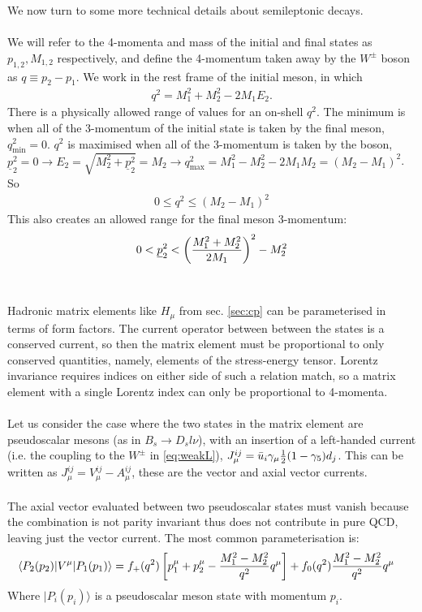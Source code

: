 We now turn to some more technical details about semileptonic decays.
\\ \\
We will refer to the 4-momenta and mass of the initial and final states as $p_{1,2},M_{1,2}$ respectively, and define the 4-momentum taken away by the $W^{\pm}$ boson as $q \equiv p_2 - p_1$. We work in the rest frame of the initial meson, in which
\begin{align}
	q^2 = M_1^2 + M_2^2 - 2M_1 E_2.
\end{align}
There is a physically allowed range of values for an on-shell $q^2$. The minimum is when all of the 3-momentum of the initial state is taken by the final meson, $q_{\text{min}} ^2 = 0$. $q^2$ is maximised when all of the 3-momentum is taken by the boson, $\underline{p}_2^2 = 0 \rightarrow E_2 = \sqrt{M_2^2 + \underline{p}_2^2 } = M_2 \rightarrow q_{\text{max}}^2 = M_1^2 - M_2^2 - 2M_1M_2 = ( M_2 - M_1 )^2$. So
\begin{align}
	0 \leq q^2 \leq ( M_2 - M_1 )^2
\end{align}
This also creates an allowed range for the final meson 3-momentum:
\begin{align}
	0 < \underline{p}_{2}^2 < \left( M_1^2 + M_2^2 \over 2M_1 \right)^2 - M_2^2
\end{align}
\\ \\
Hadronic matrix elements like $H_{\mu}$ from sec. \ref{sec:cp} can be parameterised in terms of form factors. The current operator between between the states is a conserved current, so then the matrix element must be proportional to only conserved quantities, namely, elements of the stress-energy tensor. Lorentz invariance requires indices on either side of such a relation match, so a matrix element with a single Lorentz index can only be proportional to 4-momenta.
\\ \\
Let us consider the case where the two states in the matrix element are pseudoscalar mesons (as in $B_s\to D_s l\nu$), with an insertion of a left-handed current (i.e. the coupling to the $W^{\pm}$ in \eqref{eq:weakL}), $J_{\mu}^{ij} = \bar{u}_i \gamma_{\mu} {1\over2}(1-\gamma_5) d_j$. This can be written as $J^{ij}_{\mu} = V^{ij}_{\mu} - A^{ij}_{\mu}$, these are the vector and axial vector currents. 
\\ \\
The axial vector evaluated between two pseudoscalar states must vanish because the combination is not parity invariant thus does not contribute in pure QCD, leaving just the vector current. The most common parameterisation is:
\begin{align}
\label{eq:formfactors}
\langle P_2 (p_2) | V^{\mu} | P_1 (p_1) \rangle  &= f_{+} (q^2) \left[ p_1^{\mu} + p_2^{\mu} - {M_1^2 - M_2^2 \over q^2} q^{\mu} \right] + f_0(q^2) {M_1^2 - M_2^2 \over q^2 } q^{\mu}
\end{align}
Where $|P_i(p_i)\rangle$ is a pseudoscalar meson state with momentum $p_i$.


